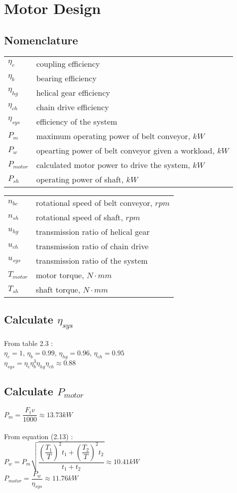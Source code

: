 \chapter{Motor Design}
\section{Nomenclature}
\begin{tabular}[t]{lp{7cm}}
	$ \eta_c $ & coupling efficiency\\
	$ \eta_b $ & bearing efficiency\\
	$ \eta_{hg} $ & helical gear efficiency\\
	$ \eta_{ch} $ & chain drive efficiency\\
	$ \eta_{sys} $ & efficiency of the system\\
	$ P_m $ & maximum operating power of belt conveyor, $ kW $\\
	$ P_w $ & opearting power of belt conveyor given a workload, $ kW $\\
	$ P_{motor} $ & calculated motor power to drive the system, $ kW $\\
	$ P_{sh} $ & operating power of shaft, $ kW $\\
\end{tabular}
\begin{tabular}[t]{lp{7cm}}
	$ n_{bc} $ & rotational speed of belt conveyor, $ rpm $\\
	$ n_{sh} $ & rotational speed of shaft, $ rpm $\\
	$ u_{hg} $ & transmission ratio of helical gear\\
	$ u_{ch} $ & transmission ratio of chain drive\\
	$ u_{sys} $ & transmission ratio of the system\\
	$ T_{motor} $ & motor torque, $ N\cdot mm $\\
	$ T_{sh} $ & shaft torque, $ N\cdot mm $
\end{tabular}
\section{Calculate $ \eta_{sys} $}
From table 2.3 :\\
$ \eta_c = 1 $, $ \eta_b = 0.99 $, $ \eta_{hg} = 0.96 $, $ \eta_{ch} = 0.95 $\\
$ \eta_{sys} = \eta_c\eta_b^3\eta_{hg}\eta_{ch} \approx 0.88 $
\section{Calculate $ P_{motor} $}
$ P_m = \dfrac{F_tv}{1000} \approx 13.73 \unit{kW}$\\\\
From equation (2.13) :\\
$ P_w = P_m\sqrt{\dfrac{\left(\dfrac{T_1}{T}\right)^2t_1 + \left(\dfrac{T_2}{T}\right)^2t_2}{t_1+t_2}} \approx 10.41 \unit{kW} $\\
$ P_{motor} = \dfrac{P_w}{\eta_{sys}} \approx 11.76\unit{kW}$
